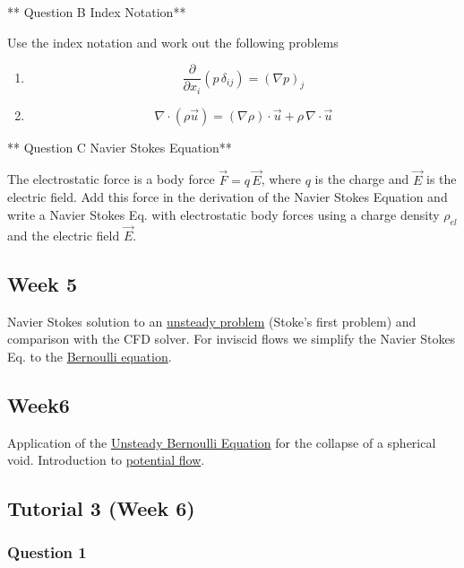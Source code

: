 \documentclass[11pt]{article}
\providecommand{\tightlist}{%
      \setlength{\itemsep}{0pt}\setlength{\parskip}{0pt}}
\begin{document}
** Question B Index Notation**

Use the index notation and work out the following problems

\begin{enumerate}
\def\labelenumi{\arabic{enumi}.}
\tightlist
\item
  \[\frac{\partial}{\partial x_i}(p\,\delta_{ij})=(\nabla p)_j\]
\item
  \[\nabla\cdot(\rho \vec{u})=(\nabla \rho)\cdot \vec{u}+\rho\,\nabla\cdot\vec{u}\]
\end{enumerate}

** Question C Navier Stokes Equation**

The electrostatic force is a body force \(\vec{F}=q\,\vec{E}\), where
\(q\) is the charge and \(\vec{E}\) is the electric field. Add this
force in the derivation of the Navier Stokes Equation and write a Navier
Stokes Eq. with electrostatic body forces using a charge density
\(\rho_{el}\) and the electric field \(\vec{E}\).

\subsection{Week 5}\label{week-5-1}

Navier Stokes solution to an
\href{Analytical\%20Solution\%20to\%20an\%20unsteady\%20flow.ipynb}{unsteady
problem} (Stoke's first problem) and comparison with the CFD solver. For
inviscid flows we simplify the Navier Stokes Eq. to the
\href{Bernoulli\%20Equation.ipynb}{Bernoulli equation}.

\subsection{Week6}\label{week6-1}

Application of the
\href{Example\%20of\%20unsteady\%20Bernoulli\%20equation.ipynb}{Unsteady
Bernoulli Equation} for the collapse of a spherical void. Introduction
to
\href{Ideal\%20Flow\%20\&\%20Solutions\%20to\%20the\%20Laplace\%20Equation.ipynb}{potential
flow}.

\subsection{Tutorial 3 (Week 6)}\label{tutorial-3-week-6-1}

\subsubsection{Question 1}\label{question-1-1}
\end{document}
